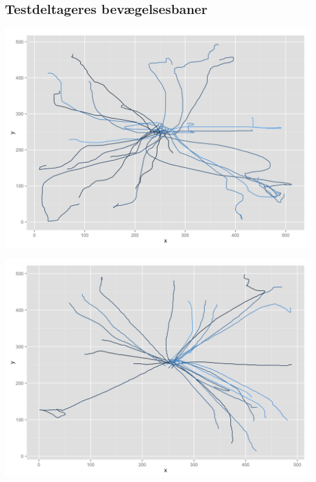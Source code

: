 \begin{appendices}
\chapter{Testdeltageres bevægelsesbaner}
\label{sec:movementlines}
\begin{minipage}{\textwidth}
	\begin{minipage}{0.5\linewidth}
		\includegraphics[width=\linewidth]{images/plots/plot_analysis_qualitative_77}
	\end{minipage}
	\begin{minipage}{0.5\linewidth}
		\includegraphics[width=\linewidth]{images/plots/plot_analysis_qualitative_45}
	\end{minipage}
	\begin{minipage}{0.5\linewidth}

\end{minipage}
\end{minipage}
\end{appendices}
